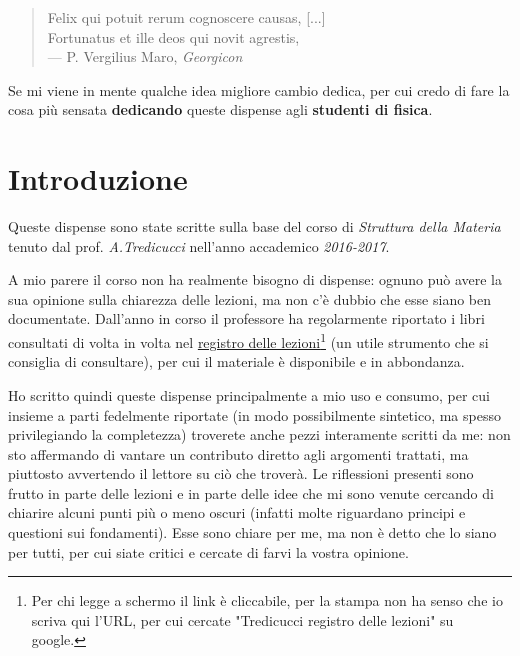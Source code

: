 \vspace*{3cm}

\begin{quote}
	Felix qui potuit rerum cognoscere causas, [...] \\
	Fortunatus et ille deos qui novit agrestis, \\ \medskip
	--- P. Vergilius Maro, \textit{Georgicon}
\end{quote}

\medskip

\begin{center}
	Se mi viene in mente qualche idea migliore cambio dedica, per cui credo di fare la cosa più sensata \textbf{dedicando} queste dispense agli \textbf{studenti di fisica}.
\end{center}


\setcounter{tocdepth}{2}
\tableofcontents
\markboth{\scshape{\contentsname}}{\scshape{\contentsname}}


\makeatletter\@openrightfalse\makeatother


\chapter*{Introduzione}

Queste dispense sono state scritte sulla base del corso di \textit{Struttura della Materia} tenuto dal prof. \textit{A.Tredicucci} nell'anno accademico \textit{2016-2017}.
\newline

A mio parere il corso non ha realmente bisogno di dispense: ognuno può avere la sua opinione sulla chiarezza delle lezioni, ma non c'è dubbio che esse siano ben documentate. Dall'anno in corso il professore ha regolarmente riportato i libri consultati di volta in volta nel \href{http://unimap.unipi.it/registri/dettregistriNEW.php?re=181626::::&ri=12126}{registro delle lezioni}\footnote{Per chi legge a schermo il link è cliccabile, per la stampa non ha senso che io scriva qui l'URL, per cui cercate "Tredicucci registro delle lezioni" su google.} (un utile strumento che si consiglia di consultare), per cui il materiale è disponibile e in abbondanza.
\newline

Ho scritto quindi queste dispense principalmente a mio uso e consumo, per cui insieme a parti fedelmente riportate (in modo possibilmente sintetico, ma spesso privilegiando la completezza) troverete anche pezzi interamente scritti da me: non sto affermando di vantare un contributo diretto agli argomenti trattati, ma piuttosto avvertendo il lettore su ciò che troverà. Le riflessioni presenti sono frutto in parte delle lezioni e in parte delle idee che mi sono venute cercando di chiarire alcuni punti più o meno oscuri (infatti molte riguardano principi e questioni sui fondamenti). Esse sono chiare per me, ma non è detto che lo siano per tutti, per cui siate critici e cercate di farvi la vostra opinione.

